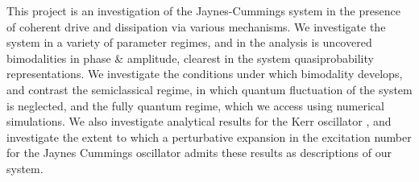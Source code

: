   This project is an investigation of the Jaynes-Cummings system in the presence of coherent drive and dissipation via various mechanisms.
We investigate the system in a variety of parameter regimes, and in the analysis is uncovered bimodalities in phase \& amplitude, clearest in the system quasiprobability representations.
We investigate the conditions under which bimodality develops, and contrast the semiclassical regime, in which quantum fluctuation of the system is neglected, and the fully quantum regime, which we access using numerical simulations.
We also investigate analytical results for the Kerr oscillator \cite{Drummond1979}, and investigate the extent to which a perturbative expansion in the excitation number for the Jaynes Cummings oscillator admits these results as descriptions of our system. 
